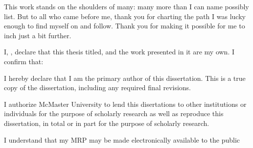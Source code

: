 \documentclass[
11pt, %
oneside, %
english, %
singlespacing, %
]{macthesis} %
\def\blankpage{%
      \clearpage%
      \thispagestyle{empty}%
      \addtocounter{page}{-1}%
      \null%
      \clearpage}
\begin{document}
\begin{acknowledgements}
    This work stands on the shoulders of many: many more than I can name possibly list. But to all who came before me, thank you for charting the path I was lucky enough to find myself on and follow. Thank you for making it possible for me to inch just a bit further.
  \end{acknowledgements}
\blankpage
\clearpage


\tableofcontents %

\listoffigures %

\listoftables %



\begin{declaration}
\addchaptertocentry{\authorshipname}

\noindent I, \authorname, declare that this thesis titled, \emph{\ttitle} and the work presented in it are my own. I confirm that:

I hereby declare that I am the primary author of this dissertation. This is a true copy of the dissertation, including any required final revisions.

I authorize McMaster University to lend this disertations to other institutions or individuals for the purpose of scholarly research as well as reproduce this dissertation, in total or in part for the purpose of scholarly research.

I understand that my MRP may be made electronically available to the public

\end{declaration}
\end{document}
